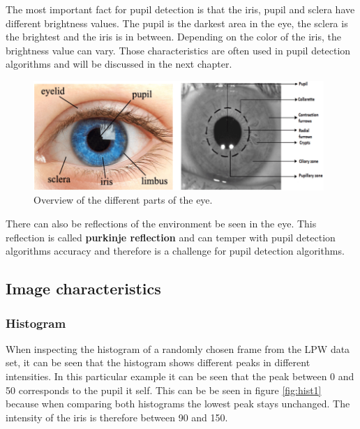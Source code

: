     The most important fact for pupil detection is that the iris, pupil and sclera have different brightness values. The pupil is the darkest area in the eye, the sclera is the brightest and the iris is in between. Depending on the color of the iris, the brightness value can vary.  Those characteristics are often used in pupil detection algorithms and will be discussed in the next chapter.
    \begin{figure}[ht]
      \centering
      \includegraphics[width=0.98\textwidth]{plots/eye_dataset/Various-characteristics-of-an-eye-and-its-iris-texture-7.png}
      \caption{Overview of the different parts of the eye.}
      \label{fig:eye_anatomy}
    \end{figure}
    There can also be reflections of the environment be seen in the eye. This reflection is called \textbf{purkinje reflection} and can temper with pupil detection algorithms accuracy and therefore is a challenge for pupil detection algorithms.


    \subsection{Image characteristics}
    \subsubsection{Histogram}
    When inspecting the histogram of a randomly chosen frame from the LPW data set, it can be seen that the histogram shows different peaks in different intensities. In this particular example it can be seen that the peak between 0 and 50 corresponds to the pupil it self. This can be be seen in figure \ref{fig:hist1} because when comparing both histograms the lowest peak stays unchanged. The intensity of the iris is therefore between 90 and 150.

